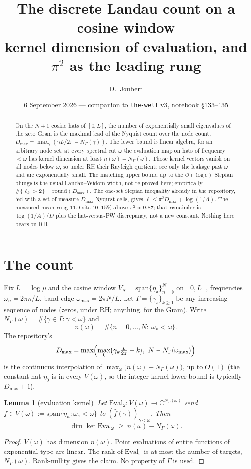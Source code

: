 \documentclass[11pt]{article}
\title{The discrete Landau count on a cosine window\\
\large kernel dimension of evaluation, and $\pi^2$ as the leading rung}
\author{D.\ Joubert}
\date{6 September 2026 --- companion to \texttt{the-well} v3, notebook \S133--135}
\newtheorem{lemma}{Lemma}
\theoremstyle{remark}\newtheorem*{remark}{Remark}
\begin{document}
\maketitle
\begin{abstract}
\noindent
On the $N{+}1$ cosine hats of $[0,L]$, the number of exponentially small
eigenvalues of the zero Gram is the maximal lead of the Nyquist count
over the node count,
$D_{\max}=\max_\gamma(\gamma L/2\pi-N_\Gamma(\gamma))$.
The lower bound is linear algebra, for an arbitrary node set: at every
spectral cut $\omega$ the evaluation map on hats of frequency ${<}\omega$
has kernel dimension at least $n(\omega)-N_\Gamma(\omega)$.
Those kernel vectors vanish on all nodes below $\omega$, so under RH
their Rayleigh quotients see only the leakage past $\omega$ and are
exponentially small.
The matching upper bound up to the $O(\log c)$ Slepian plunge is the
usual Landau--Widom width, not re-proved here; empirically
$\#\{\ell_k>2\}=\mathrm{round}(D_{\max})$.
The one-set Slepian inequality already in the repository, fed with a
set of measure $D_{\max}$ Nyquist cells, gives $\ell\le \pi^2 D_{\max}+\log(1/A)$.
The measured mean rung $11.0$ sits $10$--$15\%$ above $\pi^2\approx 9.87$;
that remainder is $\log(1/A)/D$ plus the hat-versus-PW discrepancy, not a
new constant. Nothing here bears on RH.
\end{abstract}

\section{The count}
Fix $L=\log\mu$ and the cosine window $V_N=\mathrm{span}\{\eta_n\}_{n=0}^{N}$
on $[0,L]$, frequencies $\omega_n=2\pi n/L$, band edge
$\omega_{\max}=2\pi N/L$. Let $\Gamma=\{\gamma_k\}_{k\ge 1}$ be any
increasing sequence of nodes (zeros, under RH; anything, for the Gram).
Write $N_\Gamma(\omega)=\#\{\gamma\in\Gamma:\gamma<\omega\}$ and
\[
n(\omega)=\#\{n=0,\ldots,N:\ \omega_n<\omega\}.
\]
The repository's
\[
D_{\max}
=\max\Bigl(\max_k\bigl(\gamma_k\tfrac{L}{2\pi}-k\bigr),\
N-N_\Gamma(\omega_{\max})\Bigr)
\]
is the continuous interpolation of $\max_\omega\bigl(n(\omega)-N_\Gamma(\omega)\bigr)$,
up to $O(1)$ (the constant hat $\eta_0$ is in every $V(\omega)$, so the
integer kernel lower bound is typically $D_{\max}+1$).

\begin{lemma}[evaluation kernel]
\label{lem:ker}
Let $\mathrm{Eval}_\omega:V(\omega)\to\mathbb C^{N_\Gamma(\omega)}$ send
$f\in V(\omega):=\mathrm{span}\{\eta_n:\omega_n<\omega\}$ to
$(\hat f(\gamma))_{\gamma<\omega}$. Then
\[
\dim\ker\mathrm{Eval}_\omega
\;\ge\;
n(\omega)-N_\Gamma(\omega).
\]
\end{lemma}
\begin{proof}
$V(\omega)$ has dimension $n(\omega)$. Point evaluations of entire
functions of exponential type are linear. The rank of $\mathrm{Eval}_\omega$
is at most the number of targets, $N_\Gamma(\omega)$. Rank-nullity gives
the claim. No property of $\Gamma$ is used.
\end{proof}
\end{document}
